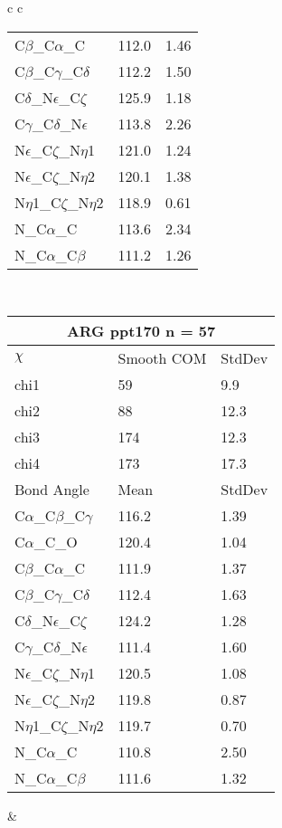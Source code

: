 \begin{longtable}{ c c }
\begin{tabular}{ l l l }
  C$\beta$\_C$\alpha$\_C & 112.0 & 1.46\\
  C$\beta$\_C$\gamma$\_C$\delta$ & 112.2 & 1.50\\
  C$\delta$\_N$\epsilon$\_C$\zeta$ & 125.9 & 1.18\\
  C$\gamma$\_C$\delta$\_N$\epsilon$ & 113.8 & 2.26\\
  N$\epsilon$\_C$\zeta$\_N$\eta$1 & 121.0 & 1.24\\
  N$\epsilon$\_C$\zeta$\_N$\eta$2 & 120.1 & 1.38\\
  N$\eta$1\_C$\zeta$\_N$\eta$2 & 118.9 & 0.61\\
  N\_C$\alpha$\_C & 113.6 & 2.34\\
  N\_C$\alpha$\_C$\beta$ & 111.2 & 1.26\\
  \bottomrule
  \end{tabular}
  \\
  \begin{tabular}{ l l l }
  \toprule
  \multicolumn{3}{c}{ARG \textbf{ppt170} n = 57} \\ \toprule
  $\chi$       & Smooth COM & StdDev \\ \midrule
  chi1 & 59 & 9.9 \\ 
  chi2 & 88 & 12.3 \\ 
  chi3 & 174 & 12.3 \\ 
  chi4 & 173 & 17.3 \\ \midrule
  Bond Angle   & Mean     & StdDev \\ \midrule
  C$\alpha$\_C$\beta$\_C$\gamma$ & 116.2 & 1.39\\
  C$\alpha$\_C\_O & 120.4 & 1.04\\
  C$\beta$\_C$\alpha$\_C & 111.9 & 1.37\\
  C$\beta$\_C$\gamma$\_C$\delta$ & 112.4 & 1.63\\
  C$\delta$\_N$\epsilon$\_C$\zeta$ & 124.2 & 1.28\\
  C$\gamma$\_C$\delta$\_N$\epsilon$ & 111.4 & 1.60\\
  N$\epsilon$\_C$\zeta$\_N$\eta$1 & 120.5 & 1.08\\
  N$\epsilon$\_C$\zeta$\_N$\eta$2 & 119.8 & 0.87\\
  N$\eta$1\_C$\zeta$\_N$\eta$2 & 119.7 & 0.70\\
  N\_C$\alpha$\_C & 110.8 & 2.50\\
  N\_C$\alpha$\_C$\beta$ & 111.6 & 1.32\\
  \bottomrule
  \end{tabular}
  &
  \begin{tabular}{ l l l }

\end{tabular}
\end{longtable}
